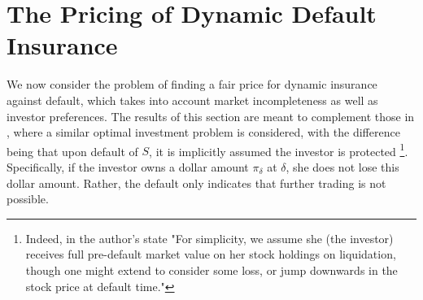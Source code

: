 \documentclass[11pt, letterpaper]{amsart}
\theoremstyle{definition}
\theoremstyle{remark}
\numberwithin{equation}{section}
\begin{document}
\section{The Pricing of Dynamic Default Insurance}\label{S:insurance} We now consider the problem of finding a fair price for dynamic insurance against default, which takes into account market incompleteness as well as investor preferences.  The results of this section are meant to complement those in \cite{MR2359373}, where a similar optimal investment problem is considered, with the difference being that upon default of $S$, it is implicitly assumed the investor is protected \footnote{Indeed, in \cite[Section 2.1]{MR2359373} the author's state "For simplicity, we assume she (the investor) receives full pre-default market value on her stock holdings on liquidation, though one might extend to consider some loss, or jump downwards in the stock price at default time."}. Specifically, if the investor owns a dollar amount $\pi_\delta$ at $\delta$, she does not lose this dollar amount. Rather, the default only indicates that further trading is not possible.
\end{document}
